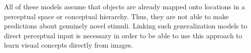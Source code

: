 All of these models assume that objects
are already mapped onto locations in a perceptual space or conceptual
hierarchy. Thus, they are not able to make predictions about genuinely
novel stimuli. Linking such generalization models to direct perceptual
input is necessary in order to be able to use this approach to learn
visual concepts directly from images.







